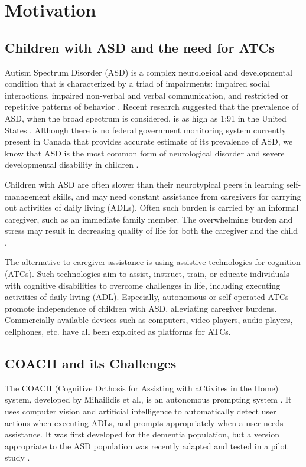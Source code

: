 \section{Motivation}

\subsection{Children with ASD and the need for ATCs}

Autism Spectrum Disorder (ASD) is a complex neurological and developmental condition that is characterized by a triad of impairments: impaired social interactions, impaired non-verbal and verbal communication, and restricted or repetitive patterns of behavior \cite{frith2005autism}.  Recent research suggested that the prevalence of ASD, when the broad spectrum is considered, is as high as 1:91 in the United States \cite{kogan2009prevalence}.  Although there is no federal government monitoring system currently present in Canada that provides accurate estimate of its prevalence of ASD, we know that ASD is the most common form of neurological disorder and severe developmental disability in children \cite{autism2014facts}.


Children with ASD are often slower than their neurotypical peers in learning self-management skills, and may need constant assistance from caregivers for carrying out activities of daily living (ADLs).  Often such burden is carried by an informal caregiver, such as an immediate family member.  The overwhelming burden and stress may result in decreasing quality of life for both the caregiver and the child \cite{burgess2007quality}.


The alternative to caregiver assistance is using assistive technologies for cognition (ATCs).  Such technologies aim to assist, instruct, train, or educate individuals with cognitive disabilities to overcome challenges in life, including executing activities of daily living (ADL).  Especially, autonomous or self-operated ATCs promote independence of children with ASD, alleviating caregiver burdens.  Commercially available devices such as computers, video players, audio players, cellphones, etc. have all been exploited as platforms for ATCs.


\subsection{COACH and its Challenges}

The COACH (Cognitive Orthosis for Assisting with aCtivites in the Home) system, developed by Mihailidis et al., is an autonomous prompting system \cite{mihailidis2008coach}.  It uses computer vision and artificial intelligence to automatically detect user actions when executing ADLs, and prompts appropriately when a user needs assistance.  It was first developed for the dementia population, but a version appropriate to the ASD population was recently adapted and tested in a pilot study \cite{bimbrahw2012investigating}.



